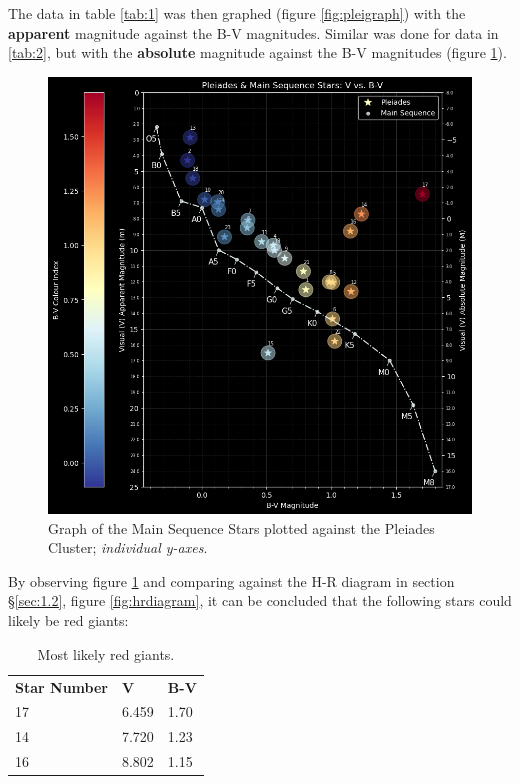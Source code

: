 \documentclass[12pt]{article}
\begin{document}
The data in table \ref{tab:1} was then graphed (figure \ref{fig:pleigraph}) with the \textbf{apparent} magnitude against the B-V magnitudes. Similar was done for data in \ref{tab:2}, but with 
the \textbf{absolute} magnitude against the B-V magnitudes (figure \ref{fig:pleimsgraph}).

\begin{figure}[H]
    \centering
    \includegraphics[width=12cm]{pleiadesms graph.png}
    \caption{\centering Graph of the Main Sequence Stars plotted against the Pleiades Cluster; \textit{individual y-axes}.}
    \label{fig:pleimsgraph}
\end{figure}

By observing figure \ref{fig:pleimsgraph} and comparing against the H-R diagram in section §\ref{sec:1.2}, figure \ref{fig:hrdiagram}, it can be concluded that the following stars could likely be red giants:

\begin{table}[H]
    \centering
    \caption{\centering Most likely red giants.}
    \begin{tabular}{p{3cm}|p{1.5cm} p{1.5cm} }
    \textbf{Star Number} & \textbf{V} & \textbf{B-V} \\
    17                   & 6.459      & 1.70         \\
    14                   & 7.720      & 1.23         \\
    16                   & 8.802      & 1.15        
    \end{tabular}
    \label{tab:3}
\end{table}
\end{document}

